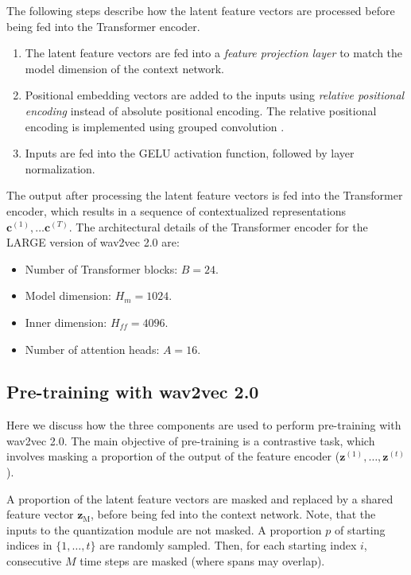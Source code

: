 The following steps describe how the latent feature vectors are processed before being fed into the Transformer encoder.
\begin{enumerate}
    \item The latent feature vectors are fed into a \emph{feature projection layer} to match the model dimension of the context network.
    \item Positional embedding vectors are added to the inputs using \emph{relative positional encoding} \cite{shaw2018relative} instead of absolute positional encoding.
    The relative positional encoding is implemented using grouped convolution \cite{AlexNet}.
    \item Inputs are fed into the GELU activation function, followed by layer normalization.
\end{enumerate}

The output after processing the latent feature vectors is fed into the Transformer encoder, which results in
a sequence of contextualized representations $\mathbf{c}^{(1)}, \dots \mathbf{c}^{(T)}$.
The architectural details of the Transformer encoder for the \textsc{LARGE} version of wav2vec 2.0 are:
\begin{itemize}
    \item Number of Transformer blocks: $B = 24$.
    \item Model dimension: $H_m = 1024$.
    \item Inner dimension: $H_{ff} = 4096$.
    \item Number of attention heads: $A = 16$.
\end{itemize}

\subsection{Pre-training with wav2vec 2.0}
Here we discuss how the three components are used to perform pre-training with wav2vec 2.0.
The main objective of pre-training is a contrastive task, which involves masking a proportion of the output of the feature encoder ($\mathbf{z}^{(1)}, \dots, \mathbf{z}^{(t)}$).

A proportion of the latent feature vectors are masked and replaced by a shared feature vector $\mathbf{z}_{\text{M}}$, before being fed into the context network.
Note, that the inputs to the quantization module are not masked.
A proportion $p$ of starting indices in $\{1, \dots, t\}$ are randomly sampled. 
Then, for each starting index $i$, consecutive $M$ time steps are masked (where spans may overlap).

